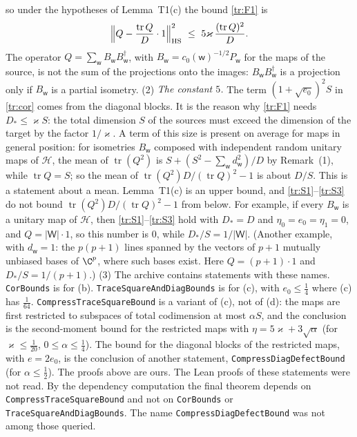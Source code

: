 \documentclass[11pt,letterpaper]{article}
\begin{document}
so under the hypotheses of Lemma~T1(c) the bound \eqref{tr:F1} is
\begin{equation}\label{tr:QHS}
 \Big\|Q-\frac{\operatorname{tr}Q}D\cdot1\Big\|_{\rm HS}^2\ \le\ 5\varkappa\,\frac{(\operatorname{tr}Q)^2}D .
\end{equation}
The operator $Q=\sum_{\mathsf w}B_{\mathsf w}B_{\mathsf w}^\dagger$, with
$B_{\mathsf w}=c_0(\mathsf w)^{-1/2}P_{\mathsf w}$ for the maps of the source, is not the sum of the projections onto the images:
$B_{\mathsf w}B_{\mathsf w}^\dagger$ is a projection only if $B_{\mathsf w}$ is a partial isometry.
(2) \emph{The constant $5$.} The term $(1+\sqrt{e_0})^2S$ in \eqref{tr:cor} comes from the diagonal blocks. It
is the reason why \eqref{tr:F1} needs $D_*\le\varkappa S$: the total dimension $S$ of the sources must exceed
the dimension of the target by the factor $1/\varkappa$. A term of this size is present on average for maps in
general position: for isometries $B_{\mathsf w}$ composed with independent random unitary maps of
$\mathcal H$, the mean of $\operatorname{tr}(Q^2)$ is $S+(S^2-\sum_{\mathsf w}d_{\mathsf w}^2)/D$ by Remark~(1), while
$\operatorname{tr}Q=S$; so the mean of $\operatorname{tr}(Q^2)D/(\operatorname{tr}Q)^2-1$ is about $D/S$. This is
a statement about a mean. Lemma~T1(c) is an upper bound, and \eqref{tr:S1}--\eqref{tr:S3} do not bound
$\operatorname{tr}(Q^2)D/(\operatorname{tr}Q)^2-1$ from below. For example, if every $B_{\mathsf w}$ is a unitary
map of $\mathcal H$, then \eqref{tr:S1}--\eqref{tr:S3} hold with $D_*=D$ and $\eta_0=e_0=\eta_1=0$, and
$Q=|\mathsf W|\cdot1$, so this number is $0$, while $D_*/S=1/|\mathsf W|$. (Another example, with $d_{\mathsf w}=1$: the $p(p+1)$ lines spanned by the vectors of $p+1$ mutually unbiased
bases of $\C^p$, where such bases exist. Here $Q=(p+1)\cdot1$ and $D_*/S=1/(p+1)$.)
(3) The archive contains statements with these names. \texttt{CorBounds} is for (b).
\texttt{TraceSquareAndDiagBounds} is for (c), with $e_0\le\frac14$ where (c) has $\frac1{64}$.
\texttt{CompressTraceSquareBound} is a variant of (c), not of (d): the maps are first restricted to
subspaces of total codimension at most $\alpha S$, and the conclusion is the second-moment bound for the
restricted maps with $\eta=5\varkappa+3\sqrt\alpha$ (for $\varkappa\le\frac1{20}$, $0\le\alpha\le\frac14$). The
bound for the diagonal blocks of the restricted maps, with $e=2e_0$, is the conclusion of another statement,
\texttt{CompressDiagDefectBound} (for $\alpha\le\frac12$). The proofs above
are ours. The Lean proofs of these statements were not read. By the dependency computation the final theorem depends on
\texttt{CompressTraceSquareBound} and not on \texttt{CorBounds} or \texttt{TraceSquareAndDiagBounds}. The name
\texttt{CompressDiagDefectBound} was not among those queried.
\end{document}
